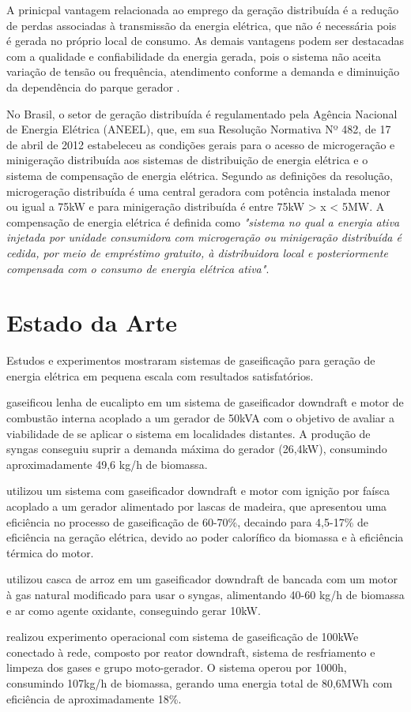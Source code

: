 A prinicpal vantagem relacionada ao emprego da geração distribuída é a redução de perdas associadas à transmissão da energia elétrica, que não é necessária pois é gerada no próprio local de consumo. As demais vantagens podem ser destacadas com a qualidade e confiabilidade da energia gerada, pois o sistema não aceita variação de tensão ou frequência, atendimento conforme a demanda e diminuição da dependência do parque gerador \cite{barbosa2013}. 

No Brasil, o setor de geração distribuída é regulamentado pela Agência Nacional de Energia Elétrica (ANEEL), que, em sua Resolução Normativa Nº 482, de 17 de abril de 2012 estabeleceu as condições gerais para o acesso de microgeração e minigeração distribuída aos sistemas de distribuição de energia elétrica e o sistema de compensação de energia elétrica. Segundo as definições da resolução, microgeração distribuída é uma central geradora com potência instalada menor ou igual a 75kW e para minigeração distribuída é entre 75kW > x < 5MW. A compensação de energia elétrica é definida como \textit{"sistema no qual a energia ativa injetada por unidade consumidora com microgeração ou minigeração distribuída é cedida, por meio de empréstimo gratuito, à distribuidora local e posteriormente compensada com o consumo de energia elétrica ativa"}.

\section{Estado da Arte}
Estudos e experimentos mostraram sistemas de gaseificação para geração de energia elétrica em pequena escala com resultados satisfatórios. 

\cite{figueiredo2012} gaseificou lenha de eucalipto em um sistema de gaseificador downdraft e motor de combustão interna acoplado a um gerador de 50kVA com o objetivo de avaliar a viabilidade de se aplicar o sistema em localidades distantes. A produção de syngas conseguiu suprir a demanda máxima do gerador (26,4kW), consumindo aproximadamente 49,6 kg/h de biomassa. 

\cite{chaves2016} utilizou um sistema com gaseificador downdraft e motor com ignição por faísca acoplado a um gerador alimentado por lascas de madeira, que apresentou uma eficiência no processo de gaseificação de 60-70\%, decaindo para 4,5-17\% de eficiência na geração elétrica, devido ao poder calorífico da biomassa e à eficiência térmica do motor.

\cite{yoon2012} utilizou casca de arroz em um gaseificador downdraft de bancada com um motor à gas natural modificado para usar o syngas, alimentando 40-60 kg/h de biomassa e ar como agente oxidante, conseguindo gerar 10kW.

\cite{dasappa2011} realizou experimento operacional com sistema de gaseificação de 100kWe conectado à rede, composto por reator downdraft, sistema de resfriamento e limpeza dos gases e grupo moto-gerador. O sistema operou por 1000h, consumindo 107kg/h de biomassa, gerando uma energia total de 80,6MWh com eficiência de aproximadamente 18\%.






